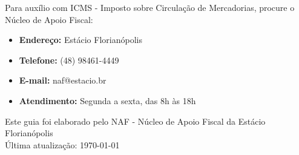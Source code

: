 \documentclass[12pt,a4paper]{article}
\begin{document}
Para auxílio com ICMS - Imposto sobre Circulação de Mercadorias, procure o Núcleo de Apoio Fiscal:

\begin{itemize}
    \item \textbf{Endereço:} Estácio Florianópolis
    \item \textbf{Telefone:} (48) 98461-4449
    \item \textbf{E-mail:} naf@estacio.br
    \item \textbf{Atendimento:} Segunda a sexta, das 8h às 18h
\end{itemize}

\vfill
\begin{center}
\footnotesize
Este guia foi elaborado pelo NAF - Núcleo de Apoio Fiscal da Estácio Florianópolis\\
Última atualização: \today
\end{center}
\end{document}
